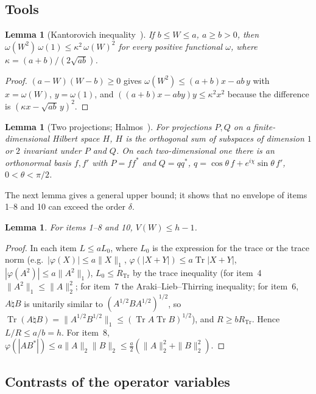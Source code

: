 \documentclass[11pt]{article}
\DeclareMathOperator{\Tr}{Tr}
\theoremstyle{plain}
\newtheorem{lemma}[theorem]{Lemma}
\theoremstyle{definition}
\theoremstyle{remark}
\begin{document}
\subsection{Tools}

\begin{lemma}[Kantorovich inequality~\cite{greub1959}]\label{lem:kant}
If $b\le W\le a$, $a\ge b>0$, then $\omega(W^2)\,\omega(1)\le\kappa^2\,\omega(W)^2$ for every positive functional
$\omega$, where $\kappa=(a+b)/(2\sqrt{ab})$.
\end{lemma}
\begin{proof}
$(a-W)(W-b)\ge0$ gives $\omega(W^2)\le(a+b)x-ab\,y$ with $x=\omega(W)$, $y=\omega(1)$, and $((a+b)x-aby)y\le\kappa^2x^2$
because the difference is $(\kappa x-\sqrt{ab}\,y)^2$.
\end{proof}

\begin{lemma}[Two projections; Halmos~\cite{halmos1969}]\label{lem:halmos}
For projections $P,Q$ on a finite-dimensional Hilbert space $H$, $H$ is the orthogonal sum of subspaces of dimension
$1$ or $2$ invariant under $P$ and $Q$. On each two-dimensional one there is an orthonormal basis $f,f'$ with $P=ff^*$
and $Q=qq^*$, $q=\cos\theta\,f+e^{i\chi}\sin\theta\,f'$, $0<\theta<\pi/2$.
\end{lemma}

The next lemma gives a general upper bound; it shows that no envelope of items 1--8 and 10 can exceed the order
$\delta$.

\begin{lemma}\label{lem:upper}
For items 1--8 and 10, $V(W)\le h-1$.
\end{lemma}
\begin{proof}
In each item $L\le aL_0$, where $L_0$ is the expression for the trace or the trace norm (e.g.\ $|\varphi(X)|\le a\|X\|_1$,
$\varphi(|X+Y|)\le a\Tr|X+Y|$, $|\varphi(A^2)|\le a\|A^2\|_1$), $L_0\le R_{\Tr}$ by the trace inequality (for item~4
$\|A^2\|_1\le\|A\|_2^2$; for item~7 the Araki--Lieb--Thirring inequality; for item~6, $A\natural B$ is unitarily similar to
$(A^{1/2}BA^{1/2})^{1/2}$, so $\Tr(A\natural B)=\|A^{1/2}B^{1/2}\|_1\le(\Tr A\Tr B)^{1/2}$), and $R\ge bR_{\Tr}$. Hence
$L/R\le a/b=h$. For item~8, $\varphi(|AB^*|)\le a\|A\|_2\|B\|_2\le\frac a2(\|A\|_2^2+\|B\|_2^2)$.
\end{proof}

\subsection{Contrasts of the operator variables}\label{sec:twocontrasts}
\end{document}
